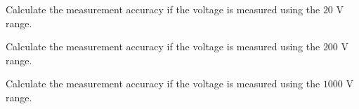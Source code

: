 \documentclass[11pt]{article}
\begin{document}
\begin{question}

\begin{subquestion}{Calculate the measurement accuracy if the voltage is measured using the $20$ V range.} 
\answer{}
\end{subquestion}
\begin{subquestion}{Calculate the measurement accuracy if the voltage is measured using the $200$ V range.} 
\answer{}
\end{subquestion}

\begin{subquestion}{Calculate the measurement accuracy if the voltage is measured using the $1000$ V range.} 
\answer{}
\end{subquestion}


\end{question}


\begin{question}


\end{question}

\end{document}

